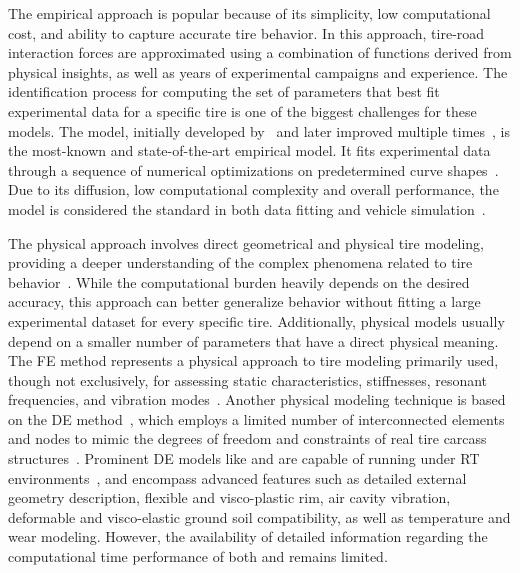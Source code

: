 The empirical approach is popular because of its simplicity, low computational cost, and ability to capture accurate tire behavior. In this approach, tire-road interaction forces are approximated using a combination of functions derived from physical insights, as well as years of experimental campaigns and experience. The identification process for computing the set of parameters that best fit experimental data for a specific tire is one of the biggest challenges for these models. The \MagicFormulae{} model, initially developed by~\citet{bakker1987tyre} and later improved multiple times~\cite{pacejka2012tire}, is the most-known and state-of-the-art empirical model. It fits experimental data through a sequence of numerical optimizations on predetermined curve shapes~\cite{bayle1993new}. Due to its diffusion, low computational complexity and overall performance, the \MagicFormulae{} model is considered the standard in both data fitting and vehicle simulation~\cite{guiggiani2014science, pacejka2012tire}.

The physical approach involves direct geometrical and physical tire modeling, providing a deeper understanding of the complex phenomena related to tire behavior~\cite{nakajima2019advanced}. While the computational burden heavily depends on the desired accuracy, this approach can better generalize behavior without fitting a large experimental dataset for every specific tire. Additionally, physical models usually depend on a smaller number of parameters that have a direct physical meaning. The \ac{FE} method represents a physical approach to tire modeling primarily used, though not exclusively, for assessing static characteristics, stiffnesses, resonant frequencies, and vibration modes~\cite{taheri2014technical}. Another physical modeling technique is based on the \ac{DE} method~\cite{karpman2020discrete}, which employs a limited number of interconnected elements and nodes to mimic the degrees of freedom and constraints of real tire carcass structures~\cite{gipser2005ftire, gallrein2007cdtire, yamashita2016physicsbased}. Prominent \ac{DE} models like \FTire{} and \CDTire{} are capable of running under \ac{RT} environments~\cite{cosinscientific, gallrein2014advanced}, and encompass advanced features such as detailed external geometry description, flexible and visco-plastic rim, air cavity vibration, deformable and visco-elastic ground soil compatibility, as well as temperature and wear modeling. However, the availability of detailed information regarding the computational time performance of both \FTire{} and \CDTire{} remains limited.

